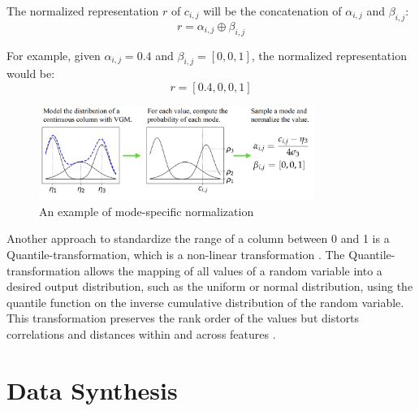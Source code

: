 \noindent The normalized representation $r$ of $c_{i,j}$ will be the concatenation of $\alpha_{i,j}$ and $\beta_{i,j}$: 
$$r=\alpha_{i,j}\oplus\beta_{i,j}$$

\noindent For example, given $\alpha_{i,j}=0.4$ and $\beta_{i,j}=[0,0,1]$, the normalized representation would be:
$$r=[0.4,0,0,1]$$

\begin{figure}[h]
    \centering
    \includegraphics[width=0.8\textwidth]{images/mode-normalization.png}
    \caption[Mode-Specific Normalization]{An example of mode-specific normalization \cite[Figure 1, p. 4]{xu2019ModelingTabularData}}
    \label{fig:mode-specific-normalization}
\end{figure}

Another approach to standardize the range of a column between 0 and 1 is a Quantile-transformation, which is a non-linear transformation \cite{scikit-learndevelopers2023PreprocessingData, kotelnikov2022TabDDPMModellingTabular}.
The Quantile-transformation allows the mapping of all values of a random variable into a desired output distribution, such as the uniform or normal distribution, 
using the quantile function on the inverse cumulative distribution of the random variable. 
This transformation preserves the rank order of the values but distorts correlations and distances within and across features \cite{scikit-learndevelopers2023PreprocessingData}.


\section{Data Synthesis}
\label{ch:preliminaries-dataSynthesis}

